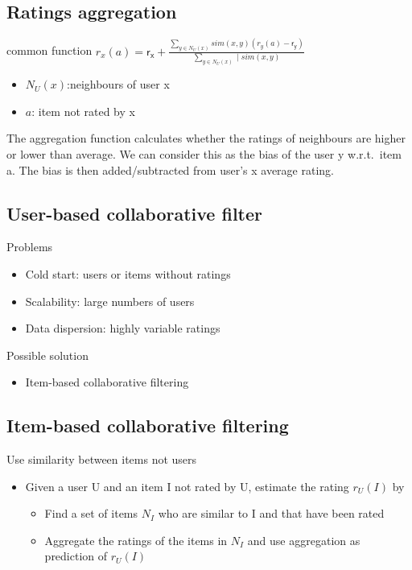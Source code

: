 \subsection{Ratings aggregation}
common function $ r_x(a) = \mathsf{r_x} + \frac{\sum_{y \in N_U(x)}
  sim(x, y)(r_y(a) - \mathsf{r_y})}{\sum_{y \in N_U(x)} \mid
  sim(x,y)} $
\begin{itemize}
\item $ N_U(x) $:neighbours of user x
\item $ a $: item not rated by x
\end{itemize}

The aggregation function calculates whether the ratings of neighbours
are higher or lower than average. We can consider this as the bias of
the user y w.r.t.\ item a. The bias is then added/subtracted from
user's x average rating.

\subsection{User-based collaborative filter}
Problems
\begin{itemize}
\item Cold start: users or items without ratings
\item Scalability: large numbers of users
\item Data dispersion: highly variable ratings
\end{itemize}

Possible solution
\begin{itemize}
\item Item-based collaborative filtering
\end{itemize}

\subsection{Item-based collaborative filtering}
Use similarity between items not users
\begin{itemize}
\item Given a user U and an item I not rated by U, estimate the rating
  $ r_U(I) $ by
  \begin{itemize}
  \item Find a set of items $ N_I $ who are similar to I and that have
    been rated
  \item Aggregate the ratings of the items in $ N_I $ and use
    aggregation as prediction of $ r_U(I) $
  \end{itemize}
\end{itemize}

